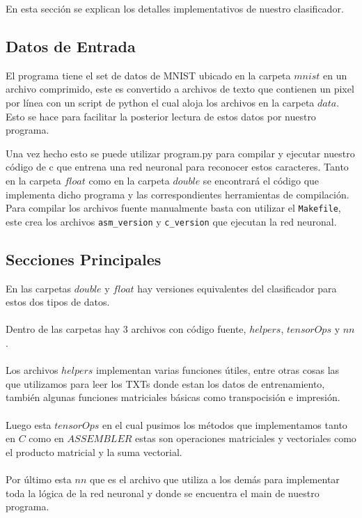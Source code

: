 
En esta sección se explican los detalles implementativos de nuestro clasificador.

\subsection{Datos de Entrada}

El programa tiene el set de datos de MNIST ubicado en la carpeta $mnist$ en un archivo comprimido, este es convertido a archivos de texto que contienen un pixel por línea con un script de python el cual aloja los archivos en la carpeta $data$. Esto se hace para facilitar la posterior lectura de estos datos por nuestro programa.

Una vez hecho esto se puede utilizar program.py para compilar y ejecutar nuestro código de c que entrena una red neuronal para reconocer estos caracteres. Tanto en la carpeta $float$ como en la carpeta $double$ se encontrará el código que implementa dicho programa y las correspondientes herramientas de compilación. Para compilar los archivos fuente manualmente basta con utilizar el \texttt{Makefile}, este crea los archivos \texttt{asm\_version} y \texttt{c\_version} que ejecutan la red neuronal.

\subsection{Secciones Principales}

En las carpetas $double$ y $float$ hay versiones equivalentes del clasificador para estos dos tipos de datos.
\\
\\
Dentro de las carpetas hay 3 archivos con código fuente, $helpers$, $tensorOps$ y $nn$.
\\
\\
Los archivos $helpers$ implementan varias funciones útiles, entre otras cosas las que utilizamos para leer los TXTs donde estan los datos de entrenamiento, también algunas funciones matriciales básicas como transpocisión e impresión.
\\
\\
Luego esta $tensorOps$ en el cual pusimos los métodos que implementamos tanto en $C$ como en $ASSEMBLER$ estas son operaciones matriciales y vectoriales como el producto matricial y la suma vectorial.
\\
\\
Por último esta $nn$ que es el archivo que utiliza a los demás para implementar toda la lógica de la red neuronal y donde se encuentra el main de nuestro programa.

